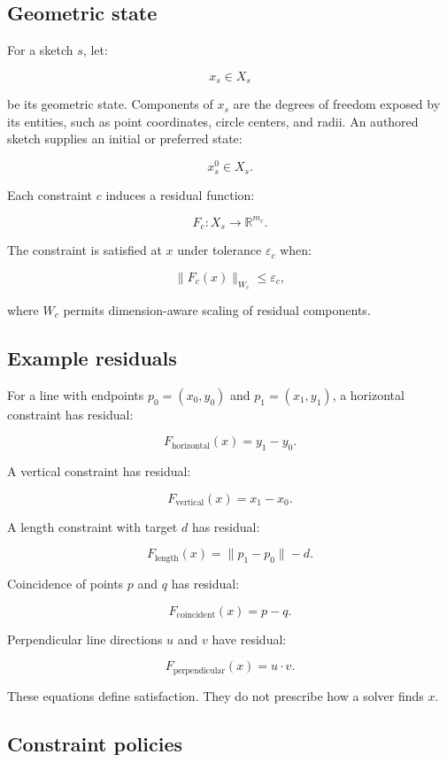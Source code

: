 \documentclass[11pt]{article}
\begin{document}
\subsection{Geometric state}

For a sketch $s$, let:

\[
x_s\in X_s
\]

be its geometric state. Components of $x_s$ are the degrees of freedom exposed
by its entities, such as point coordinates, circle centers, and radii. An
authored sketch supplies an initial or preferred state:

\[
x_s^0\in X_s.
\]

Each constraint $c$ induces a residual function:

\[
F_c:X_s\rightarrow\mathbb{R}^{m_c}.
\]

The constraint is satisfied at $x$ under tolerance $\varepsilon_c$ when:

\[
\lVert F_c(x)\rVert_{W_c}\leq\varepsilon_c,
\]

where $W_c$ permits dimension-aware scaling of residual components.

\subsection{Example residuals}

For a line with endpoints $p_0=(x_0,y_0)$ and $p_1=(x_1,y_1)$, a horizontal
constraint has residual:

\[
F_{\mathrm{horizontal}}(x)=y_1-y_0.
\]

A vertical constraint has residual:

\[
F_{\mathrm{vertical}}(x)=x_1-x_0.
\]

A length constraint with target $d$ has residual:

\[
F_{\mathrm{length}}(x)=\lVert p_1-p_0\rVert-d.
\]

Coincidence of points $p$ and $q$ has residual:

\[
F_{\mathrm{coincident}}(x)=p-q.
\]

Perpendicular line directions $u$ and $v$ have residual:

\[
F_{\mathrm{perpendicular}}(x)=u\cdot v.
\]

These equations define satisfaction. They do not prescribe how a solver finds
$x$.

\subsection{Constraint policies}
\end{document}
